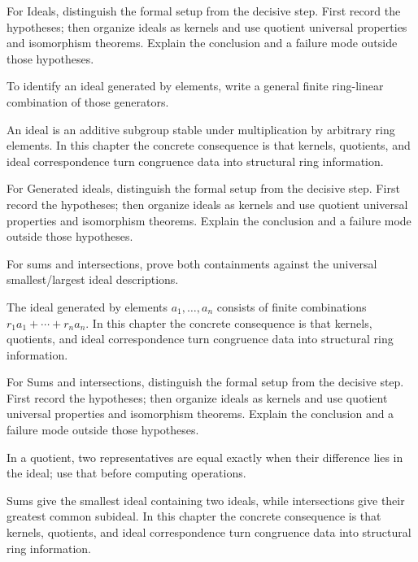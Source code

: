 \begin{exercise}\label{exr:v01-02}
For Ideals, distinguish the formal setup from the decisive step. First record the hypotheses; then organize ideals as kernels and use quotient universal properties and isomorphism theorems. Explain the conclusion and a failure mode outside those hypotheses.
\end{exercise}
\begin{hint}
To identify an ideal generated by elements, write a general finite ring-linear combination of those generators.
\end{hint}
\begin{solution}
An ideal is an additive subgroup stable under multiplication by arbitrary ring elements. In this chapter the concrete consequence is that kernels, quotients, and ideal correspondence turn congruence data into structural ring information.
\end{solution}

\begin{exercise}\label{exr:v01-03}
For Generated ideals, distinguish the formal setup from the decisive step. First record the hypotheses; then organize ideals as kernels and use quotient universal properties and isomorphism theorems. Explain the conclusion and a failure mode outside those hypotheses.
\end{exercise}
\begin{hint}
For sums and intersections, prove both containments against the universal smallest/largest ideal descriptions.
\end{hint}
\begin{solution}
The ideal generated by elements $a_1,\dots,a_n$ consists of finite combinations $r_1a_1+\cdots+r_na_n$. In this chapter the concrete consequence is that kernels, quotients, and ideal correspondence turn congruence data into structural ring information.
\end{solution}

\begin{exercise}\label{exr:v01-04}
For Sums and intersections, distinguish the formal setup from the decisive step. First record the hypotheses; then organize ideals as kernels and use quotient universal properties and isomorphism theorems. Explain the conclusion and a failure mode outside those hypotheses.
\end{exercise}
\begin{hint}
In a quotient, two representatives are equal exactly when their difference lies in the ideal; use that before computing operations.
\end{hint}
\begin{solution}
Sums give the smallest ideal containing two ideals, while intersections give their greatest common subideal. In this chapter the concrete consequence is that kernels, quotients, and ideal correspondence turn congruence data into structural ring information.
\end{solution}

